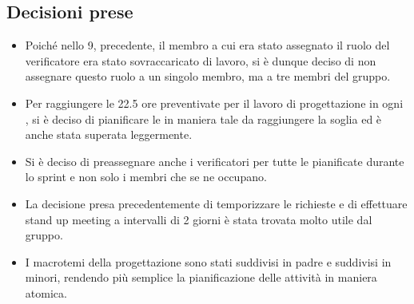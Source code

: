 \documentclass[a4paper, 12pt]{article}
\begin{document}
\subsection{Decisioni prese}
\begin{itemize}
    \item Poiché nello  9, precedente, il membro a cui era stato assegnato il ruolo del verificatore era stato sovraccaricato di lavoro, si è dunque deciso di non assegnare questo ruolo a un singolo membro, ma a tre membri del gruppo.
    \item Per raggiungere le 22.5 ore preventivate per il lavoro di progettazione in ogni , si è deciso di pianificare le  in maniera tale da raggiungere la soglia ed è anche stata superata leggermente.
    \item Si è deciso di preassegnare anche i verificatori per tutte le  pianificate durante lo sprint e non solo i membri che se ne occupano.
    \item La decisione presa precedentemente di temporizzare le richieste e di effettuare stand up meeting a intervalli di 2 giorni è stata trovata molto utile dal gruppo.
    \item I macrotemi della progettazione sono stati suddivisi in  padre e suddivisi in  minori, rendendo più semplice la pianificazione delle attività in maniera atomica.
\end{itemize}
\end{document}
